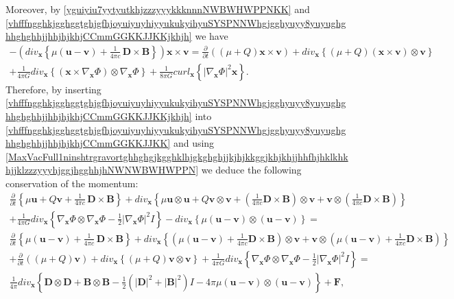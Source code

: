 \documentclass{article}
\theoremstyle{definition}
\theoremstyle{remark}
\renewcommand{\vec}[1]{\mathbf{#1}}
\newcommand{\er}{\eqref}
\newcommand{\er}{\eqref}
\begin{document}
Moreover, by \er{yguiyiu7yytyutkhjzzzyyykkknnnNWBWHWPPNKK} and
\er{vhfffngghkjgghggtghjgfhjoyuiyuyhiyyukukyihyuSYSPNNWhgjgghyuyy8yuyughghhghghhjjhhjhjkhjCCmmGGKKJJKKjkhjh}
we have
\begin{multline}\label{vhfffngghkjgghggtghjgfhjoyuiyuyhiyyukukyihyuSYSPNNWhgjgghyuyy8yuyughghhghghhjjhhjhjkhjCCmmGGKKJJKKjkhjhyyyuu}
-\left(div_{\vec x}\left\{\mu \left(\vec u-\vec v\right)
+\frac{1}{4\pi c}\,\vec D\times \vec B\right\}\right)\vec
x\times\vec v= \frac{\partial}{\partial
t}\left(\left(\mu+Q\right)\vec x\times\vec v\right)+div_{\vec
x}\left\{\left(\mu+Q\right)\left(\vec x\times\vec
v\right)\otimes\vec v\right\}\\+\frac{1}{4\pi G}div_{\vec
x}\left\{\left(\vec x\times\nabla_{\vec x}\Phi\right)\otimes
\nabla_{\vec x}\Phi\right\}+\frac{1}{8\pi G}curl_{\vec
x}\left\{\left|\nabla_{\vec x}\Phi\right|^2\vec x\right\}.
\end{multline}
Therefore, by inserting
\er{vhfffngghkjgghggtghjgfhjoyuiyuyhiyyukukyihyuSYSPNNWhgjgghyuyy8yuyughghhghghhjjhhjhjkhjCCmmGGKKJJKKjkhjh}
into
\er{vhfffngghkjgghggtghjgfhjoyuiyuyhiyyukukyihyuSYSPNNWhgjgghyuyy8yuyughghhghghhjjhhjhjkhjCCmmGGKKJJKK}
and using
\er{MaxVacFull1ninshtrgravortghhghgjkgghklhjgkghghjjkjhjkkggjkhjkhjjhhfhjhklkhkhjjklzzzyyyhjggjhgghhjhNWNWBWHWPPN}
we deduce the following conservation of the momentum:
\begin{multline}\label{vhfffngghkjgghggtghjgfhjoyuiyuyhiyyukukyihyuSYSPNNWhgjgghyuyy8yuyughghhghghhjjhhjhjkhjCCmmGGKKJJKKhghgghghgh}
\frac{\partial}{\partial t}\left\{ \mu\vec u+Q\vec v +\frac{1}{4\pi
c}\,\vec D\times \vec B\right\}+ div_{\vec x}\left\{\mu\vec
u\otimes\vec u+Q\vec v\otimes\vec v+\left(\frac{1}{4\pi c}\vec
D\times \vec B\right)\otimes \vec v+\vec v\otimes\left(\frac{1}{4\pi
c}\vec D\times \vec B\right)\right\}
\\+\frac{1}{4\pi G}div_{\vec x}\left\{\nabla_{\vec
x}\Phi\otimes \nabla_{\vec x}\Phi-\frac{1}{2}\left|\nabla_{\vec
x}\Phi\right|^2I\right\}-div_\vec x\left\{\mu
\left(\vec u-\vec v\right)\otimes(\vec u-\vec v)\right\}=\\
\frac{\partial}{\partial t}\left\{ \mu \left(\vec u-\vec v\right)
+\frac{1}{4\pi c}\,\vec D\times \vec B\right\}+ div_{\vec
x}\left\{\left(\mu \left(\vec u-\vec v\right)+\frac{1}{4\pi c}\vec
D\times \vec B\right)\otimes \vec v+\vec v\otimes\left(\mu\left(\vec
u-\vec v\right)+\frac{1}{4\pi c}\vec D\times \vec B\right)\right\}
\\+\frac{\partial}{\partial t}\left(\left(\mu+Q\right)\vec
v\right)+div_{\vec x}\left\{\left(\mu+Q\right)\vec v\otimes\vec
v\right\}+\frac{1}{4\pi G}div_{\vec x}\left\{\nabla_{\vec
x}\Phi\otimes \nabla_{\vec x}\Phi-\frac{1}{2}\left|\nabla_{\vec
x}\Phi\right|^2I\right\}=\\
\frac{1}{4\pi}div_\vec x\left\{\vec D\otimes \vec D+\vec B\otimes
\vec B-\frac{1}{2}\left(|\vec D|^2+|\vec B|^2\right)I-4\pi\mu
\left(\vec u-\vec v\right)\otimes(\vec u-\vec v)\right\}+\vec F,
\end{multline}
\end{document}
